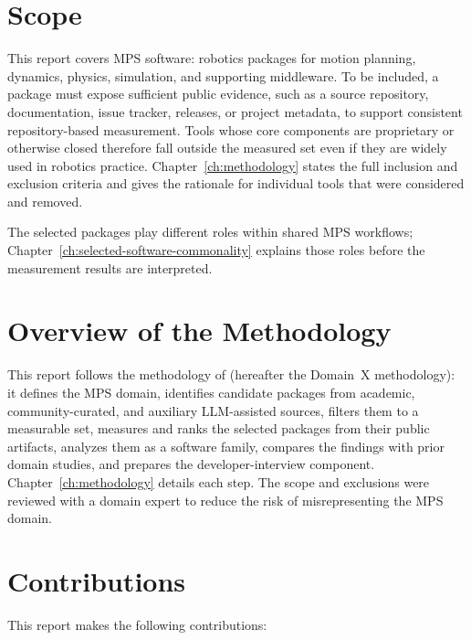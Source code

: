 \section{Scope}
\label{sec:introduction-scope}

This report covers MPS software: robotics packages for motion planning, dynamics, physics, simulation, and supporting middleware. To be included, a package must expose sufficient public evidence, such as a source repository, documentation, issue tracker, releases, or project metadata, to support consistent repository-based measurement. Tools whose core components are proprietary or otherwise closed therefore fall outside the measured set even if they are widely used in robotics practice. Chapter~\ref{ch:methodology} states the full inclusion and exclusion criteria and gives the rationale for individual tools that were considered and removed.

The selected packages play different roles within shared MPS workflows; Chapter~\ref{ch:selected-software-commonality} explains those roles before the measurement results are interpreted.

\section{Overview of the Methodology}
\label{sec:methodology-overview}

This report follows the methodology of \citet{Smith2021} (hereafter the Domain~X methodology): it defines the MPS domain, identifies candidate packages from academic, community-curated, and auxiliary LLM-assisted sources, filters them to a measurable set, measures and ranks the selected packages from their public artifacts, analyzes them as a software family, compares the findings with prior domain studies, and prepares the developer-interview component. Chapter~\ref{ch:methodology} details each step. The scope and exclusions were reviewed with a domain expert to reduce the risk of misrepresenting the MPS domain.

\section{Contributions}
\label{sec:contributions}

This report makes the following contributions:

